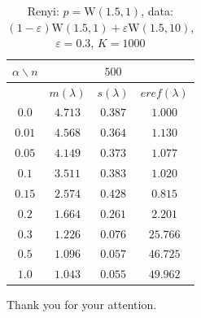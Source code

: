 \documentclass[11pt,a4paper]{beamer}
\begin{document}
\begin{frame}
\begin{table}[ht] \footnotesize 
\begin{center} 
\begin{tabular}{|c|ccc|} 
\hline 
$\alpha\backslash n$ &&  $500$ & \\ 
\hline 
& $m(\lambda)$ & $s(\lambda)$ & $eref(\lambda)$ \\ 
\hline 
$0.0$ & $ 4.713 $ & $ 0.387 $ & $ 1.000 $\\ 
\hline 
$0.01$ & $ 4.568 $ & $ 0.364 $ & $ 1.130 $\\ 
\hline 
$0.05$ & $ 4.149 $ & $ 0.373 $ & $ 1.077 $\\ 
\hline 
$0.1$ &$ 3.511 $ & $ 0.383 $ & $ 1.020 $\\ 
\hline 
$0.15$ & $ 2.574 $ & $ 0.428 $ & $ 0.815 $\\ 
\hline 
$0.2$ & $ 1.664 $ & $ 0.261 $ & $ 2.201 $\\ 
\hline 
$0.3$ &  $ 1.226 $ & $ 0.076 $ & $ 25.766 $\\ 
\hline 
$0.5$ & $ 1.096 $ & $ 0.057 $ & $ 46.725 $\\ 
\hline 
$1.0$ & $ 1.043 $ & $ 0.055 $ & $ 49.962 $\\ 
\hline 
\end{tabular}
\caption{Renyi: $p = \mathrm{W}(1.5,1)$, data: $(1-\varepsilon)\mathrm{W}(1.5,1) + \varepsilon \mathrm{W}(1.5,10)$, $\varepsilon =  0.3$, $K = 1000$} 
\end{center}
\end{table}
\end{frame}
%
%		

\begin{frame}
	\begin{center}
		Thank you for your attention.
	\end{center}
\end{frame}
\end{document}
